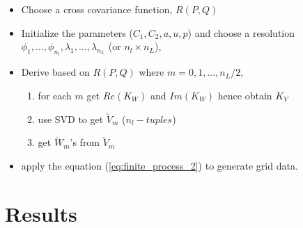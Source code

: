 	\begin{framed}
		\begin{itemize}
			\item Choose a cross covariance function, $R(P,Q)$
			\item Initialize the parameters ($C_1, C_2, a, u, p$) and choose a resolution $\phi_1,\ldots,\phi_{n_l}, \lambda_1, \ldots, \lambda_{n_L}$ (or $n_l\times n_L$),
			\item Derive \Cm based on $R(P,Q)$ where $m=0,1,\ldots,n_L/2$,
			      \begin{enumerate}
			      	\item for each $m$ get $Re(K_W)$ and $Im(K_W)$ hence obtain $K_V$
			      	\item use SVD to get $\utilde{V}_m$ ($n_l-tuples$)
			      	\item get $\utilde{W}_m$'s from $\utilde{V}_m$
			      \end{enumerate}
			      		      		      
			\item apply the equation (\ref{eq:finite_process_2}) to generate grid data.
		\end{itemize}
	\end{framed}
			
	\section{Results}
		
	
			
